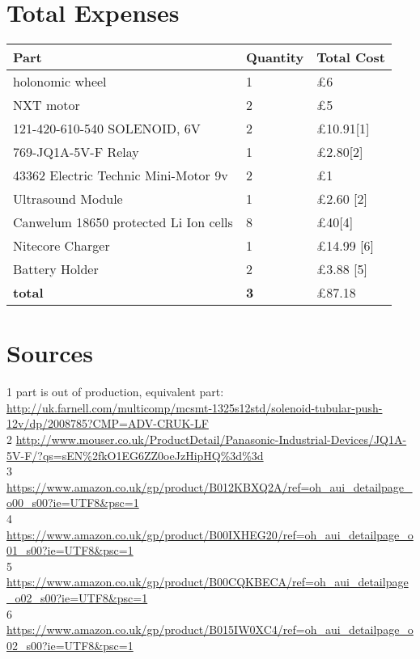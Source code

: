 \documentclass[a4paper]{article}
\begin{document}
\section {Total Expenses}
\begin{center}
\begin{tabular}{ | m{3cm} | m{3cm}| m{6cm} | }
\hline
\textbf{Part} & \textbf{Quantity} & \textbf{Total Cost} \\
\hline
holonomic wheel & 1 & £6 \\
\hline
NXT motor       & 2 & £5 \\
\hline
121-420-610-540  SOLENOID, 6V & 2 &  £10.91[1] \\
\hline
769-JQ1A-5V-F Relay & 1 &  £2.80[2] \\
\hline

43362 Electric Technic Mini-Motor 9v & 2 & £1 \\
\hline
Ultrasound Module       & 1 & £2.60 [2]\\
\hline

Canwelum 18650 protected Li Ion cells & 8 &  £40[4] \\
\hline
Nitecore Charger & 1 & £14.99 [6]\\
\hline
Battery Holder & 2 & £3.88 [5]\\
\hline
\textbf{total} & \textbf{3} & £87.18 \\
\hline
\end{tabular}
\end{center}


\section{Sources}
1 part is out of production, equivalent part: \url{http://uk.farnell.com/multicomp/mcsmt-1325s12std/solenoid-tubular-push-12v/dp/2008785?CMP=ADV-CRUK-LF} \\
2 \url{http://www.mouser.co.uk/ProductDetail/Panasonic-Industrial-Devices/JQ1A-5V-F/?qs=sEN\%2fkO1EG6ZZ0oeJzHipHQ\%3d\%3d}\\ 
3 \url{https://www.amazon.co.uk/gp/product/B012KBXQ2A/ref=oh_aui_detailpage_o00_s00?ie=UTF8&psc=1}\\
4 \url{https://www.amazon.co.uk/gp/product/B00IXHEG20/ref=oh_aui_detailpage_o01_s00?ie=UTF8&psc=1}\\
5 \url{https://www.amazon.co.uk/gp/product/B00CQKBECA/ref=oh_aui_detailpage_o02_s00?ie=UTF8&psc=1}\\
6 \url{https://www.amazon.co.uk/gp/product/B015IW0XC4/ref=oh_aui_detailpage_o02_s00?ie=UTF8&psc=1}\\
\end{document}
